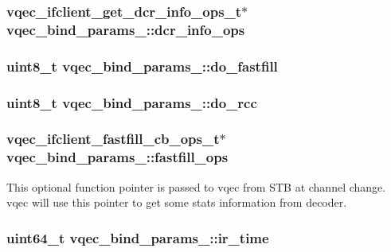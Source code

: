 \subsubsection{\setlength{\rightskip}{0pt plus 5cm}\bf{vqec\_\-ifclient\_\-get\_\-dcr\_\-info\_\-ops\_\-t}$\ast$ \bf{vqec\_\-bind\_\-params\_\-::dcr\_\-info\_\-ops}}\label{structvqec__bind__params___f19247e028fc36d195f44728d524e2e2}


\subsubsection{\setlength{\rightskip}{0pt plus 5cm}uint8\_\-t \bf{vqec\_\-bind\_\-params\_\-::do\_\-fastfill}}\label{structvqec__bind__params___b0c91d49cb055a1d6759cbd862f848d0}


\subsubsection{\setlength{\rightskip}{0pt plus 5cm}uint8\_\-t \bf{vqec\_\-bind\_\-params\_\-::do\_\-rcc}}\label{structvqec__bind__params___87cb0919632051ff81c949ca80fad669}


\subsubsection{\setlength{\rightskip}{0pt plus 5cm}\bf{vqec\_\-ifclient\_\-fastfill\_\-cb\_\-ops\_\-t}$\ast$ \bf{vqec\_\-bind\_\-params\_\-::fastfill\_\-ops}}\label{structvqec__bind__params___93332d6dab06b443334af7f1175cc74f}


This optional function pointer is passed to vqec from STB at channel change. vqec will use this pointer to get some stats information from decoder. 
\subsubsection{\setlength{\rightskip}{0pt plus 5cm}uint64\_\-t \bf{vqec\_\-bind\_\-params\_\-::ir\_\-time}}\label{structvqec__bind__params___83a25600f329ad5e3a72750ad552f55f}



